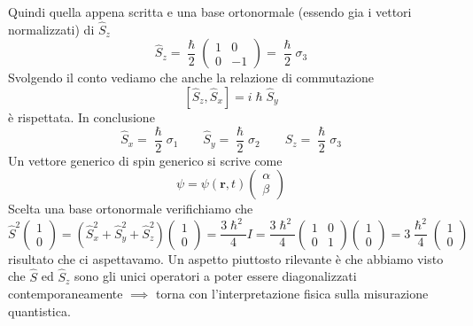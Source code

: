 Quindi quella appena scritta e una base
ortonormale (essendo gia i vettori normalizzati) di \(\hat{S}_{z}\)
\[
    \hat{S}_{z} = \frac{\hslash}{2}
    \begin{pmatrix}
        1 & 0  \\
        0 & -1
    \end{pmatrix} = \frac{\hslash}{2} \sigma_{3}
\] Svolgendo il conto vediamo che anche la relazione di commutazione
\[
    [ \hat{S}_{z}, \hat{S}_{x}] = i \hslash \hat{S}_{y}
\]
è rispettata.
In conclusione
\[
    \hat{S}_{x} = \frac{\hslash}{2} \sigma_{1} \qquad
    \hat{S}_{y} =  \frac{\hslash}{2} \sigma_{2} \qquad
    \hat{S}_{z} = \frac{\hslash}{2} \sigma_{3}
\] Un vettore generico di spin generico si scrive come
\[
    \psi = \psi (\bm{r},t)
    \begin{pmatrix}
        \alpha \\
        \beta
    \end{pmatrix}
\]
Scelta una base ortonormale verifichiamo che
\[
    \hat{S}^{2}
    \begin{pmatrix}
        1 \\
        0
    \end{pmatrix}
    = (\hat{S}_{x}^{2} + \hat{S}_{y}^{2}+\hat{S}_{z}^{2})\begin{pmatrix}
                                                             1 \\
                                                             0
    \end{pmatrix} = \frac{3 \hslash^{2}}{4} I = \frac{3\hslash^{2}}{4} \begin{pmatrix}
                                                                           1 & 0 \\
                                                                           0 & 1
    \end{pmatrix}\begin{pmatrix}
                     1 \\
                     0
    \end{pmatrix}
    = 3 \frac{\hslash^{2}}{4} \begin{pmatrix}
                                  1 \\
                                  0
    \end{pmatrix}
\] risultato che ci aspettavamo.
Un aspetto piuttosto rilevante è che
abbiamo visto che \(\hat{S}\) ed \(\hat{S}_{z}\) sono gli unici
operatori a poter essere diagonalizzati contemporaneamente \(\implies\)
torna con l'interpretazione fisica sulla misurazione quantistica.
